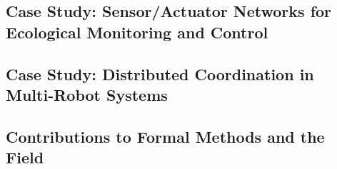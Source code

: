 \subsection{Case Study: Sensor/Actuator Networks for Ecological Monitoring and Control}
\label{sec:case-study}


\subsection{Case Study: Distributed Coordination in Multi-Robot Systems}
\label{sec:case-study-robots}


\subsection{Contributions to Formal Methods and the Field}
\label{sec:contributions}



